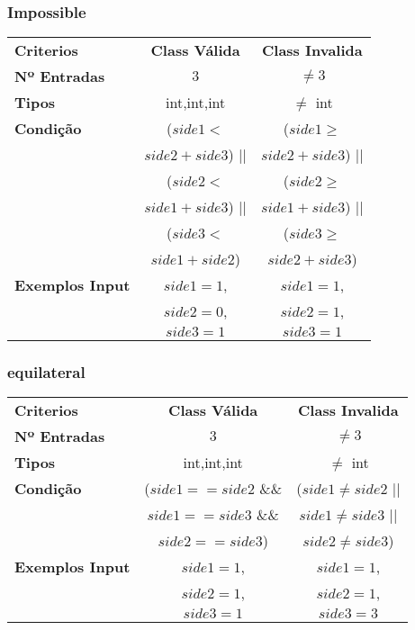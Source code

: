 \subsubsection{Impossible}
\begin{center}
  \begin{tabular}{lcc}
    \textbf{Criterios}  & \textbf{Class Válida} & \textbf{Class Invalida} \\
    \textbf{Nº Entradas} & $ 3 $ & $ \ne 3 $ \\
    \textbf{Tipos} & int,int,int & $\ne$ int  \\
    \textbf{Condição}
    & ($side1 < $         & ($side1 \geq$ \\
    & $side2 + side3$) || & $side2 + side3$) || \\
    & ($side2 <$          & ($side2 \geq$ \\
    & $side1 + side3$) || & $side1 + side3$) || \\
    & ($side 3 <$         & ($side3 \geq$ \\
    & $side1 + side2$)    & $side2 + side3$) \\
    \textbf{Exemplos Input}
    & $side1=1$, & $side1=1$, \\
    & $side2=0$, & $side2=1$, \\
    & $side3=1$  & $side3=1$
  \end{tabular}
\end{center}

\subsubsection{equilateral}
\begin{center}
  \begin{tabular}{lcc}
    \textbf{Criterios}  & \textbf{Class Válida} & \textbf{Class Invalida} \\
    \textbf{Nº Entradas} & $ 3 $ & $ \ne 3 $ \\
    \textbf{Tipos} & int,int,int & $\ne$ int  \\
    \textbf{Condição}
    & ($side1==side2 $ \&\& & ($side1 \ne side2$ || \\
    & $side1==side3 $ \&\&  & $side1 \ne side3$ || \\
    & $side2==side3$)       & $side2 \ne side3$) \\
    \textbf{Exemplos Input}
    & $side1=1$, & $side1=1$, \\
    & $side2=1$, & $side2=1$, \\
    & $side3=1$  & $side3=3$
  \end{tabular}
\end{center}

